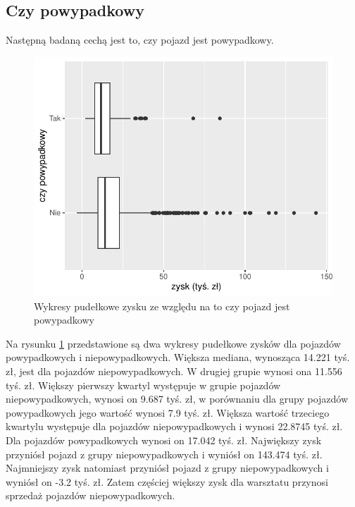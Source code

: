 \documentclass{article}\usepackage[]{graphicx}\usepackage[]{xcolor}
\makeatletter
\def\maxwidth{ %
  \ifdim\Gin@nat@width>\linewidth
    \linewidth
  \else
    \Gin@nat@width
  \fi
}
\newenvironment{knitrout}{}{} %
\makeatother
\begin{document}
\subsection{Czy powypadkowy}

Następną badaną cechą jest to, czy pojazd jest powypadkowy.

\begin{knitrout}
\color{fgcolor}\begin{figure}[H]

{\centering \includegraphics[width=\maxwidth]{figure/fig_wypadkowy-1} 

}

\caption[Wykresy pudełkowe zysku ze względu na to czy pojazd jest powypadkowy]{Wykresy pudełkowe zysku ze względu na to czy pojazd jest powypadkowy}\label{fig:fig_wypadkowy}
\end{figure}

\end{knitrout}

Na rysunku \ref{fig:fig_wypadkowy} przedstawione są dwa wykresy pudełkowe zysków dla pojazdów powypadkowych i niepowypadkowych. Większa mediana, wynosząca 14.221 tyś. zł, jest dla pojazdów niepowypadkowych. W drugiej grupie wynosi ona 11.556 tyś. zł. 
Większy pierwszy kwartyl występuje w grupie pojazdów niepowypadkowych, wynosi on 9.687 tyś. zł, w porównaniu dla grupy pojazdów powypadkowych jego wartość wynosi 7.9 tyś. zł.
Większa wartość trzeciego kwartylu występuje dla pojazdów niepowypadkowych i wynosi 22.8745 tyś. zł. Dla pojazdów powypadkowych wynosi on 17.042 tyś. zł.
Największy zysk przyniósł pojazd z grupy niepowypadkowych i wyniósł on 143.474 tyś. zł. 
Najmniejszy zysk natomiast przyniósł pojazd z grupy niepowypadkowych i wyniósł on -3.2 tyś. zł. Zatem częściej większy zysk dla warsztatu przynosi sprzedaż pojazdów niepowypadkowych. 
\end{document}
